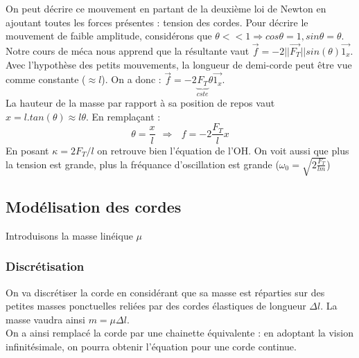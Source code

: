 \documentclass	[11pt, a4paper, openany]{book}
\begin{document}
On peut décrire ce mouvement en partant de la deuxième loi de Newton en ajoutant toutes les forces présentes : tension des cordes. Pour décrire le mouvement de faible amplitude, considérons que $\theta << 1 \Rightarrow cos\theta = 1, sin\theta = \theta$.\\

Notre cours de méca nous apprend que la résultante vaut $\vec{f} = -2||\vec{F_T}||sin(\theta) \vec{1_x}$. Avec l'hypothèse des petits mouvements, la longueur de demi-corde peut être vue comme constante ($\approx l$). On a donc : $\vec{f} = -2\underbrace{F_T}_{cste}\theta\vec{1_x}$.\\
La hauteur de la masse par rapport à sa position de repos vaut $x = l.tan(\theta) \approx l\theta$. En remplaçant :
\begin{equation}
\theta = \frac{x}{l}\ \ \Rightarrow\ \ \ f = -2\frac{F_T}{l}x
\end{equation}
En posant $\kappa = 2F_T/l$ on retrouve bien l'équation de l'OH. On voit aussi que plus la tension est grande, plus la fréquance d'oscillation est grande ($\omega_0 = \sqrt{2\frac{F_T}{lm}}$)

\subsection{Modélisation des cordes}
Introduisons la masse linéique $\mu$
\subsubsection{Discrétisation}
On va discrétiser la corde en considérant que sa masse est réparties sur des petites masses ponctuelles reliées par des cordes élastiques de longueur $\Delta l$. La masse vaudra ainsi $m = \mu\Delta l$.\\
On a ainsi remplacé la corde par une chainette équivalente : en adoptant la vision infinitésimale, on pourra obtenir l'équation pour une corde continue.
\end{document}
